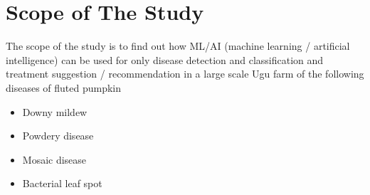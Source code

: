 \section{Scope of The Study}
The scope of the study is to find out how ML/AI (machine learning / artificial intelligence) can be used for only disease detection and classification and treatment suggestion / recommendation in a large scale Ugu farm of the following diseases of fluted pumpkin {\bfseries 
	\begin{itemize}
		\item Downy mildew
		\item Powdery disease
		\item Mosaic disease
		\item Bacterial leaf spot
	\end{itemize}
} \label{ref:ugu_diseases}